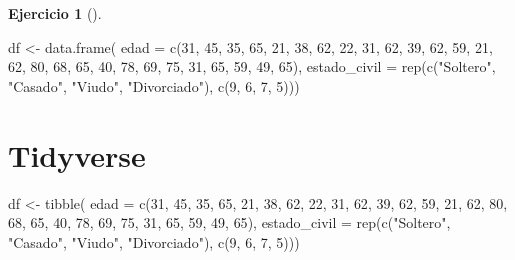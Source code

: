 \documentclass[
  a4paper,
]{scrreport}
\newenvironment{Shaded}{\begin{snugshade}}{\end{snugshade}}
\newcommand{\AttributeTok}[1]{\textcolor[rgb]{0.40,0.45,0.13}{#1}}
\newcommand{\DecValTok}[1]{\textcolor[rgb]{0.68,0.00,0.00}{#1}}
\newcommand{\FunctionTok}[1]{\textcolor[rgb]{0.28,0.35,0.67}{#1}}
\newcommand{\NormalTok}[1]{\textcolor[rgb]{0.00,0.23,0.31}{#1}}
\newcommand{\OtherTok}[1]{\textcolor[rgb]{0.00,0.23,0.31}{#1}}
\newcommand{\StringTok}[1]{\textcolor[rgb]{0.13,0.47,0.30}{#1}}
\theoremstyle{definition}
\newtheorem{exercise}{Ejercicio}[chapter]
\theoremstyle{remark}
\begin{document}
\begin{exercise}[]
\begin{enumerate}
\begin{tcolorbox}
\begin{Shaded}
\begin{Highlighting}[]
\NormalTok{df }\OtherTok{\textless{}{-}} \FunctionTok{data.frame}\NormalTok{(}
    \AttributeTok{edad =} \FunctionTok{c}\NormalTok{(}\DecValTok{31}\NormalTok{, }\DecValTok{45}\NormalTok{, }\DecValTok{35}\NormalTok{, }\DecValTok{65}\NormalTok{, }\DecValTok{21}\NormalTok{, }\DecValTok{38}\NormalTok{, }\DecValTok{62}\NormalTok{, }\DecValTok{22}\NormalTok{, }\DecValTok{31}\NormalTok{, }\DecValTok{62}\NormalTok{, }\DecValTok{39}\NormalTok{, }\DecValTok{62}\NormalTok{, }\DecValTok{59}\NormalTok{, }\DecValTok{21}\NormalTok{, }\DecValTok{62}\NormalTok{, }\DecValTok{80}\NormalTok{, }\DecValTok{68}\NormalTok{, }\DecValTok{65}\NormalTok{, }\DecValTok{40}\NormalTok{, }\DecValTok{78}\NormalTok{, }\DecValTok{69}\NormalTok{, }\DecValTok{75}\NormalTok{, }\DecValTok{31}\NormalTok{, }\DecValTok{65}\NormalTok{, }\DecValTok{59}\NormalTok{, }\DecValTok{49}\NormalTok{, }\DecValTok{65}\NormalTok{), }
    \AttributeTok{estado\_civil =} \FunctionTok{rep}\NormalTok{(}\FunctionTok{c}\NormalTok{(}\StringTok{"Soltero"}\NormalTok{, }\StringTok{"Casado"}\NormalTok{, }\StringTok{"Viudo"}\NormalTok{, }\StringTok{"Divorciado"}\NormalTok{), }\FunctionTok{c}\NormalTok{(}\DecValTok{9}\NormalTok{, }\DecValTok{6}\NormalTok{, }\DecValTok{7}\NormalTok{, }\DecValTok{5}\NormalTok{)))}
\end{Highlighting}
\end{Shaded}

  \section{Tidyverse}

\begin{Shaded}
\begin{Highlighting}[]
\NormalTok{df }\OtherTok{\textless{}{-}} \FunctionTok{tibble}\NormalTok{(}
    \AttributeTok{edad =} \FunctionTok{c}\NormalTok{(}\DecValTok{31}\NormalTok{, }\DecValTok{45}\NormalTok{, }\DecValTok{35}\NormalTok{, }\DecValTok{65}\NormalTok{, }\DecValTok{21}\NormalTok{, }\DecValTok{38}\NormalTok{, }\DecValTok{62}\NormalTok{, }\DecValTok{22}\NormalTok{, }\DecValTok{31}\NormalTok{, }\DecValTok{62}\NormalTok{, }\DecValTok{39}\NormalTok{, }\DecValTok{62}\NormalTok{, }\DecValTok{59}\NormalTok{, }\DecValTok{21}\NormalTok{, }\DecValTok{62}\NormalTok{, }\DecValTok{80}\NormalTok{, }\DecValTok{68}\NormalTok{, }\DecValTok{65}\NormalTok{, }\DecValTok{40}\NormalTok{, }\DecValTok{78}\NormalTok{, }\DecValTok{69}\NormalTok{, }\DecValTok{75}\NormalTok{, }\DecValTok{31}\NormalTok{, }\DecValTok{65}\NormalTok{, }\DecValTok{59}\NormalTok{, }\DecValTok{49}\NormalTok{, }\DecValTok{65}\NormalTok{), }
    \AttributeTok{estado\_civil =} \FunctionTok{rep}\NormalTok{(}\FunctionTok{c}\NormalTok{(}\StringTok{"Soltero"}\NormalTok{, }\StringTok{"Casado"}\NormalTok{, }\StringTok{"Viudo"}\NormalTok{, }\StringTok{"Divorciado"}\NormalTok{), }\FunctionTok{c}\NormalTok{(}\DecValTok{9}\NormalTok{, }\DecValTok{6}\NormalTok{, }\DecValTok{7}\NormalTok{, }\DecValTok{5}\NormalTok{)))}
\end{Highlighting}
\end{Shaded}


\end{tcolorbox}
\end{enumerate}
\end{exercise}
\end{document}
